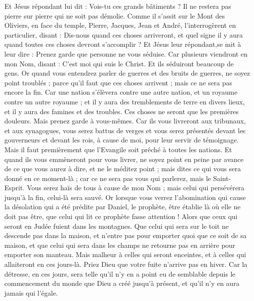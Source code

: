 \begin{multicols}{2}
Et Jésus répondant lui dit : Vois-tu ces grands bâtiments ? Il ne restera pas pierre sur pierre qui ne soit pas démolie.
Comme il s’assit sur le Mont des Oliviers, en face du temple, Pierre, Jacques, Jean et André, l'interrogèrent en particulier,
disant : Dis-nous quand ces choses arriveront, et quel signe il y aura quand toutes ces choses devront s’accomplir ?
Et Jésus leur répondant,se mit à leur dire : Prenez garde que personne ne vous séduise.
Car plusieurs viendront en mon Nom, disant : C'est moi qui suis le Christ. Et ils séduiront beaucoup de gens.
Or quand vous entendrez parler de guerres et des bruits de guerres, ne soyez point troublés ; parce qu'il faut que ces choses arrivent ; mais ce ne sera pas encore la fin.
Car une nation s'élèvera contre une autre nation, et un royaume contre un autre royaume ; et il y aura des tremblements de terre en divers lieux, et il y aura des famines et des troubles. Ces choses ne seront que les premières douleurs.
Mais prenez garde à vous-mêmes. Car ils vous livreront aux tribunaux, et aux synagogues, vous serez battus de verges et vous serez présentés devant les gouverneurs et devant les rois, à cause de moi, pour leur servir de témoignage.
Mais il faut premièrement que l'Evangile soit prêché à toutes les nations.
Et quand ils vous emmèneront pour vous livrer, ne soyez point en peine par avance de ce que vous aurez à dire, et ne le méditez point ; mais dites ce qui vous sera donné en ce moment-là ; car ce ne sera pas vous qui parlerez, mais le Saint-Esprit.
Vous serez haïs de tous à cause de mon Nom ; mais celui qui persévérera jusqu’à la fin, celui-là sera sauvé.
Or lorsque vous verrez l'abomination qui cause la désolation qui a été prédite par Daniel, le prophète, être établie là où elle ne doit pas être, que celui qui lit ce prophète fasse attention ! Alors que ceux qui seront en Judée fuient dans les montagnes.
Que celui qui sera sur le toit ne descende pas dans la maison, et n’entre pas pour emporter quoi que ce soit de sa maison,
et que celui qui sera dans les champs ne retourne pas en arrière pour emporter son manteau.
Mais malheur à celles qui seront enceintes, et à celles qui allaiteront en ces jours-là.
Priez Dieu que votre fuite n'arrive pas en hiver.
Car la détresse, en ces jours, sera telle qu’il n’y en a point eu de semblable depuis le commencement du monde que Dieu a créé jusqu’à présent, et qu’il n’y en aura jamais qui l'égale.

\end{multicols}
